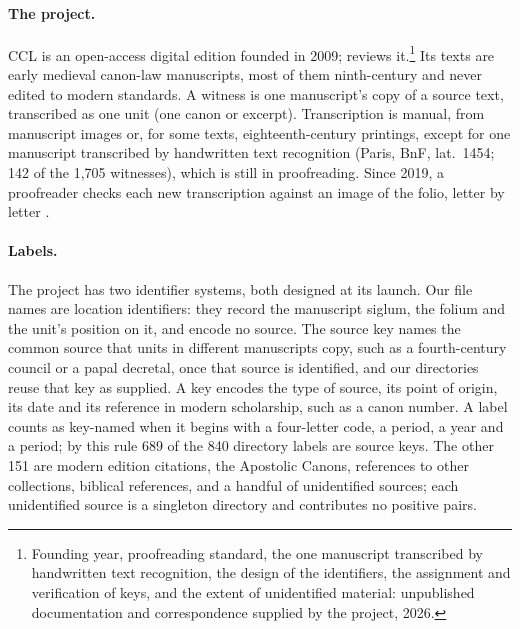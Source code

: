 \documentclass[11pt]{article}
\begin{document}
\paragraph{The project.} CCL \citep{firey2009ccl} is an open-access digital edition founded in 2009; \citet{eichbauer2014ccl} reviews it.\footnote{Founding year, proofreading standard, the one manuscript transcribed by handwritten text recognition, the design of the identifiers, the assignment and verification of keys, and the extent of unidentified material: unpublished documentation and correspondence supplied by the project, 2026.} Its texts are early medieval canon-law manuscripts, most of them ninth-century and never edited to modern standards. A witness is one manuscript's copy of a source text, transcribed as one unit (one canon or excerpt). Transcription is manual, from manuscript images or, for some texts, eighteenth-century printings, except for one manuscript transcribed by handwritten text recognition (Paris, BnF, lat.\ 1454; 142 of the 1,705 witnesses), which is still in proofreading. Since 2019, a proofreader checks each new transcription against an image of the folio, letter by letter \citep{ccl2026desks}.

\paragraph{Labels.} The project has two identifier systems, both designed at its launch. Our file names are location identifiers: they record the manuscript siglum, the folium and the unit's position on it, and encode no source. The source key names the common source that units in different manuscripts copy, such as a fourth-century council or a papal decretal, once that source is identified, and our directories reuse that key as supplied. A key encodes the type of source, its point of origin, its date and its reference in modern scholarship, such as a canon number. A label counts as key-named when it begins with a four-letter code, a period, a year and a period; by this rule 689 of the 840 directory labels are source keys. The other 151 are modern edition citations, the Apostolic Canons, references to other collections, biblical references, and a handful of unidentified sources; each unidentified source is a singleton directory and contributes no positive pairs.
\end{document}
